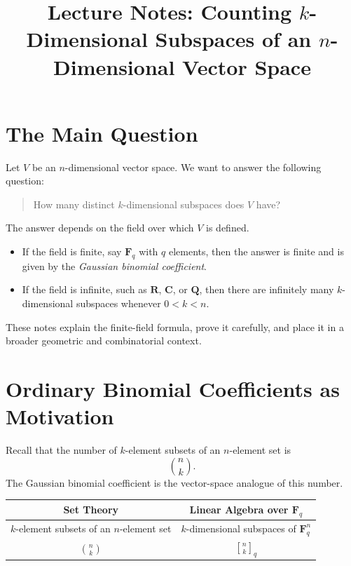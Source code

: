 \documentclass[11pt]{article}
\title{Lecture Notes: Counting \(k\)-Dimensional Subspaces of an \(n\)-Dimensional Vector Space}
\author{}
\date{}
\theoremstyle{definition}
\theoremstyle{remark}
\newcommand{\F}{\mathbf{F}}
\newcommand{\R}{\mathbf{R}}
\newcommand{\C}{\mathbf{C}}
\newcommand{\Q}{\mathbf{Q}}
\newcommand{\qbinom}[2]{\genfrac{[}{]}{0pt}{}{#1}{#2}_q}
\begin{document}
	
	\maketitle
	
	\tableofcontents
	
	\section{The Main Question}
	
	Let \(V\) be an \(n\)-dimensional vector space. We want to answer the following question:
	
	\begin{quote}
		How many distinct \(k\)-dimensional subspaces does \(V\) have?
	\end{quote}
	
	The answer depends on the field over which \(V\) is defined.
	
	\begin{itemize}
		\item If the field is finite, say \(\F_q\) with \(q\) elements, then the answer is finite and is given by the \emph{Gaussian binomial coefficient}.
		\item If the field is infinite, such as \(\R\), \(\C\), or \(\Q\), then there are infinitely many \(k\)-dimensional subspaces whenever \(0<k<n\).
	\end{itemize}
	
	These notes explain the finite-field formula, prove it carefully, and place it in a broader geometric and combinatorial context.
	
	\section{Ordinary Binomial Coefficients as Motivation}
	
	Recall that the number of \(k\)-element subsets of an \(n\)-element set is
	\[
	\binom{n}{k}.
	\]
	The Gaussian binomial coefficient is the vector-space analogue of this number.
	
	\begin{center}
		\begin{tabular}{c|c}
			Set Theory & Linear Algebra over \(\F_q\) \\ \hline
			\(k\)-element subsets of an \(n\)-element set & \(k\)-dimensional subspaces of \(\F_q^n\) \\
			\(\binom{n}{k}\) & \(\qbinom{n}{k}\)
		\end{tabular}
	\end{center}
	
\end{document}
